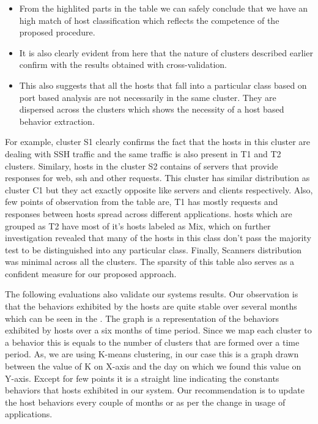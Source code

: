 \begin{itemize}
	\item From the highlited parts in the table we can safely conclude that we have an high match of host classification which reflects the competence of the proposed procedure.
	
	\item  It is also clearly evident from here that the nature of clusters described earlier confirm with the results obtained with cross-validation.
	
	\item This also suggests that all the hosts that fall into a particular class based on port based analysis are not necessarily in the same cluster. They are dispersed across the clusters which shows the necessity of a host based behavior extraction.	
\end{itemize}
  For example, cluster S1 clearly confirms the fact that the hosts in this cluster are dealing with SSH traffic and the same traffic is also present in T1 and T2 clusters. Similary, hosts in the cluster S2 contains of servers that provide responses for web, ssh and other requests. This cluster has similar distribution as cluster C1 but they act exactly opposite like servers and clients respectively. Also, few points of observation from the table are, T1 has mostly requests and responses between hosts spread across different applications. hosts which are grouped as T2 have most of it's hosts labeled as Mix, which on further investigation revealed that many of the hosts in this class don't pass the majority test to be distinguished into any particular class. Finally, Scanners distribution was minimal across all the clusters. The sparsity of this table also serves as a confident measure for our proposed approach.

The following evaluations also validate our systems results.
Our observation is that the behaviors exhibited by the hosts are quite stable over several months which can be seen in the  . The graph is a representation of the behaviors exhibited by hosts over a six months of time period. Since we map each cluster to a behavior this is equals to the number of clusters that are formed over a time period. As, we are using K-means clustering, in our case this is a graph drawn between the  value of K on X-axis and the day on which we found this value on Y-axis. Except for few points it is a straight line indicating the constants behaviors that hosts exhibited in our system. Our recommendation is to update the host behaviors every couple of months or as per the change in usage of applications.


